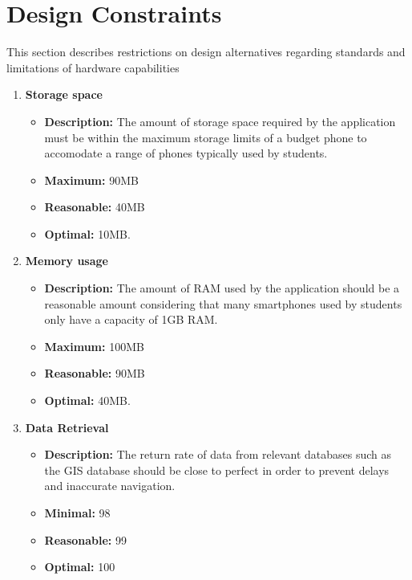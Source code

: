 \documentclass[11pt]{article}
\begin{document}
	\section{Design Constraints}
	This section describes restrictions on design alternatives regarding standards and limitations of hardware capabilities
	\begin{enumerate}
		\item \textbf{Storage space}
		\begin{itemize}
			\item \textbf{Description:} The amount of storage space required by the application must be within the maximum storage limits of a budget phone to accomodate a range of phones typically used by students.
			\item \textbf{Maximum:} 90MB
			\item \textbf{Reasonable:} 40MB
			\item \textbf{Optimal:} 10MB.\newline
		\end{itemize}
	
		\item \textbf{Memory usage}
		\begin{itemize}
			\item \textbf{Description:} The amount of RAM used by the application should be a reasonable amount considering that many smartphones used by students only have a capacity of 1GB RAM.
			\item \textbf{Maximum:} 100MB
			\item \textbf{Reasonable:} 90MB
			\item \textbf{Optimal:} 40MB.\newline
		\end{itemize}
		
		\item \textbf{Data Retrieval}
		\begin{itemize}
			\item \textbf{Description:} The return rate of data from relevant databases such as the GIS database should be close to perfect in order to prevent delays and inaccurate navigation.
			\item \textbf{Minimal:} 98%
			\item \textbf{Reasonable:} 99%
			\item \textbf{Optimal:} 100%
		\end{itemize}
		

\end{enumerate}
\end{document}
